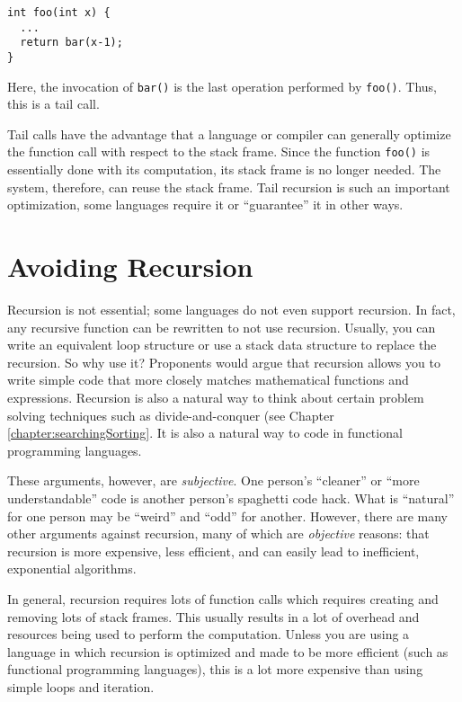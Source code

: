 \begin{verbatim}
int foo(int x) {
  ...
  return bar(x-1);
}
\end{verbatim}

Here, the invocation of \texttt{bar()} is the last operation
performed by \texttt{foo()}.  Thus, this is a tail call.

Tail calls have the advantage that a language or compiler can generally
optimize the function call with respect to the stack frame.  Since the
function \texttt{foo()} is essentially done with its computation, 
its stack frame is no longer needed.  The system, therefore, can reuse
the stack frame.  Tail recursion is such an important optimization, some
languages require it or ``guarantee'' it in other ways.

\section{Avoiding Recursion}

Recursion is not essential; some languages do not even support recursion.
In fact, any recursive function can be rewritten to not use recursion.
Usually, you can write an equivalent loop structure or use a stack
data structure to replace the recursion.
So why use it?  Proponents would argue that recursion allows you to 
write simple code that more closely matches mathematical functions and
expressions.  Recursion is also a natural way to think about certain
problem solving techniques such as divide-and-conquer (see Chapter 
\ref{chapter:searchingSorting}.  It is also a natural way to code
in functional programming languages.

These arguments, however, are \emph{subjective}.  One person's 
``cleaner'' or ``more understandable'' code is another person's 
spaghetti code hack.  What is ``natural'' for one person may be 
``weird'' and ``odd'' for another.  However, there are many other
arguments against recursion, many of which are \emph{objective} 
reasons: that recursion is more expensive, less efficient, and can
easily lead to inefficient, exponential algorithms.

In general, recursion requires lots of function calls which requires 
creating and removing lots of stack frames.  This usually results in 
a lot of overhead and resources being used to perform the computation.  
Unless you are using a language in which recursion is optimized and
made to be more efficient (such as functional programming
languages), this is a lot more expensive than using simple loops and
iteration.  


